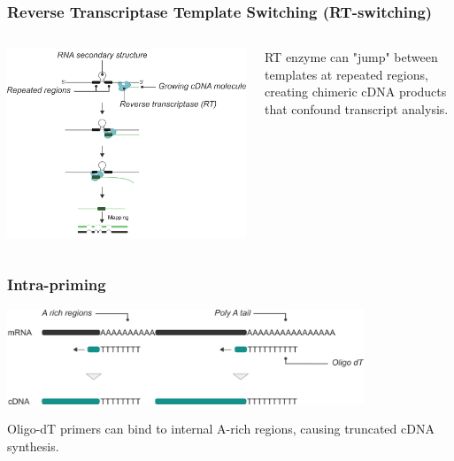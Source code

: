 \documentclass[aspectratio=169]{beamer}
\begin{document}
\begin{frame}
  \frametitle{Reverse Transcriptase Template Switching (RT-switching)}
  \begin{columns}[T]
    \begin{column}{0.6\textwidth}
      \centering
      \includegraphics[width=\textwidth]{rt-switching.png}
    \end{column}
    \begin{column}{0.35\textwidth}
      \small
      RT enzyme can "jump" between templates at repeated regions, creating chimeric cDNA products that confound transcript analysis.
    \end{column}
  \end{columns}
\end{frame}

\begin{frame}
  \frametitle{Intra-priming}
  \centering
  \includegraphics[width=0.8\textwidth]{intra-priming.png}
  
  \vspace{0.5cm}
  
  \small
  Oligo-dT primers can bind to internal A-rich regions, causing truncated cDNA synthesis.
\end{frame}
\end{document}
